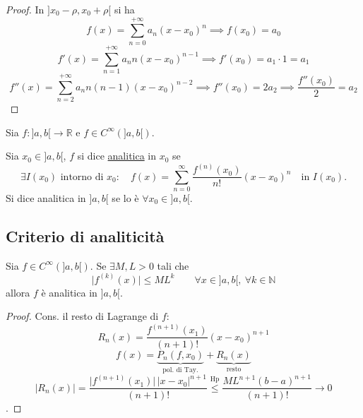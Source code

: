 \begin{proof}
In $]x_0 - \rho, x_0 + \rho[$ si ha
\[
f(x) = \sum_{n=0}^{+\infty} a_n (x - x_0)^n \implies f(x_0) = a_0
\]
\[
f'(x) = \sum_{n=1}^{+\infty} a_n n (x - x_0)^{n-1} \implies f'(x_0) = a_1 \cdot 1 = a_1
\]
\[
f''(x) = \sum_{n=2}^{+\infty} a_n n(n-1)(x - x_0)^{n-2} \implies f''(x_0) = 2 a_2 \implies \frac{f''(x_0)}{2} = a_2
\]
\end{proof}

\begin{definition}
Sia $f : ]a, b[ \to \mathbb{R}$ e $f \in C^\infty(]a, b[)$.

Sia $x_0 \in ]a, b[$, $f$ si dice \underline{analitica} in $x_0$ se
\[
\exists I(x_0) \text{ intorno di } x_0 : \quad f(x) = \sum_{n=0}^{\infty} \frac{f^{(n)}(x_0)}{n!} (x - x_0)^n \quad \text{in } I(x_0).
\]
Si dice analitica in $]a, b[$ se lo è $\forall x_0 \in ]a, b[$.
\end{definition}


\subsection{Criterio di analiticità}

\begin{theorem}
Sia $f \in C^\infty(]a, b[)$. Se $\exists M, L > 0$ tali che
\[
\vert f^{(k)}(x) \vert \le M L^k \qquad \forall x \in ]a, b[, \ \forall k \in \mathbb{N}
\]
allora $f$ è analitica in $]a, b[$.
\end{theorem}

\begin{proof}
Cons. il resto di Lagrange di $f$:
\[
R_n(x) = \frac{f^{(n+1)}(x_1)}{(n+1)!} (x - x_0)^{n+1}
\]
\[
f(x) = \underbrace{P_n(f, x_0)}_{\text{pol. di Tay.}} + \underbrace{R_n(x)}_{\text{resto}}
\]
\[
\vert R_n(x) \vert = \frac{\vert f^{(n+1)}(x_1) \vert \, \vert x - x_0 \vert^{n+1}}{(n+1)!} \stackrel{\text{Hp}}{\le} \frac{M L^{n+1} (b - a)^{n+1}}{(n+1)!} \to 0
\]
.
\end{proof}
